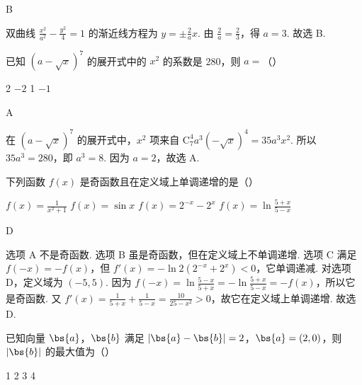 \documentclass[UTF8,a4paper,oneside,11pt]{ctexbook}
\begin{document}
\begin{answer}
B
\end{answer}

\begin{solution}
双曲线 \( \frac{x^2}{a^2}-\frac{y^2}{4}=1 \) 的渐近线方程为 \( y=\pm \frac{2}{a}x \). 由 \( \frac{2}{a}=\frac{2}{3} \)，得 \( a=3 \). 故选 B.
\end{solution}

\begin{problem}
已知 \( \left( a-\sqrt{x} \right)^7 \) 的展开式中的 \( x^2 \) 的系数是 280，则 \( a=\)（\quad）

\choices
    {2}
    {\(-2\)}
    {1}
    {\(-1\)}
\end{problem}

\begin{answer}
A
\end{answer}

\begin{solution}
在 \( \left( a-\sqrt{x} \right)^7 \) 的展开式中，\( x^2 \) 项来自 \( \mathrm C_7^4 a^3\left( -\sqrt{x} \right)^4=35a^3x^2 \). 所以 \( 35a^3=280 \)，即 \( a^3=8 \). 因为 \( a=2 \)，故选 A.
\end{solution}

\begin{problem}
下列函数 \( f(x) \) 是奇函数且在定义域上单调递增的是（\quad）

\choices
    {\( f(x)=\frac{1}{x^2+1} \)}
    {\( f(x)=\sin x \)}
    {\( f(x)=2^{-x}-2^x \)}
    {\( f(x)=\ln \frac{5+x}{5-x} \)}
\end{problem}

\begin{answer}
D
\end{answer}

\begin{solution}
选项 A 不是奇函数. 选项 B 虽是奇函数，但在定义域上不单调递增. 选项 C 满足 \( f\left( -x \right)=-f\left( x \right) \)，但 \( f'\left( x \right)=-\ln 2\left( 2^{-x}+2^x \right)<0 \)，它单调递减.
对选项 D，定义域为 \( \left( -5,5 \right) \). 因为 \( f\left( -x \right)=\ln \frac{5-x}{5+x}=-\ln \frac{5+x}{5-x}=-f\left( x \right) \)，所以它是奇函数. 又 \( f'\left( x \right)=\frac{1}{5+x}+\frac{1}{5-x}=\frac{10}{25-x^2}>0 \)，故它在定义域上单调递增. 故选 D.
\end{solution}

\begin{problem}
已知向量 \( \bs{a} \)，\( \bs{b} \) 满足 \( \left| \bs{a}-\bs{b} \right|=2 \)，\( \bs{a}=\left( 2,0 \right) \)，则 \( \left| \bs{b} \right| \) 的最大值为（\quad）

\choices
    {1}
    {2}
    {3}
    {4}
\end{problem}
\end{document}
